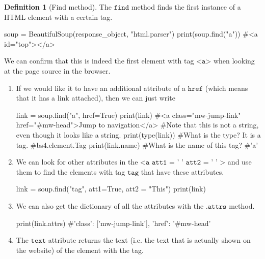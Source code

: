 \documentclass[a4paper, 12pt]{report}
\theoremstyle{remark}
\theoremstyle{definition}
\newtheorem{definition}{Definition}[section]
\begin{document}
\begin{definition}[Find method]
The $\texttt{find}$ method finds the first instance of a HTML element with a certain tag. 
\begin{python}
    soup = BeautifulSoup(response_object, "html.parser") 
    print(soup.find("a"))
    #<a id="top"></a>
\end{python}
We can confirm that this is indeed the first element with tag $\texttt{<a>}$ when looking at the page source in the browser. 
\begin{enumerate}
    \item If we would like it to have an additional attribute of a $\texttt{href}$ (which means that it has a link attached), then we can just write
    \begin{python}
    link = soup.find("a", href=True)
    print(link)
    #<a class="mw-jump-link" href="#mw-head">Jump to navigation</a>
    #Note that this is not a string, even though it looks like a string. 
    print(type(link))     #What is the type? It is a tag.
    #bs4.element.Tag 
    print(link.name)      #What is the name of this tag? 
    #'a'
    \end{python}
    
    \item We can look for other attributes in the $\texttt{<a att1 = ' ' att2 = ' ' >}$ and use them to find the elements with tag $\texttt{tag}$ that have these attributes. 
    \begin{python}
    link = soup.find("tag", att1=True, att2 = "This")
    print(link) 
    \end{python}
    
    \item We can also get the dictionary of all the attributes with the $\texttt{.attrs}$ method. 
    \begin{python}
    print(link.attrs) 
    #{'class': ['mw-jump-link'], 'href': '#mw-head'}
    \end{python}
    
    \item The $\texttt{text}$ attribute returns the text (i.e. the text that is actually shown on the website) of the element with the tag. 
\end{enumerate}
\end{definition}
\end{document}
